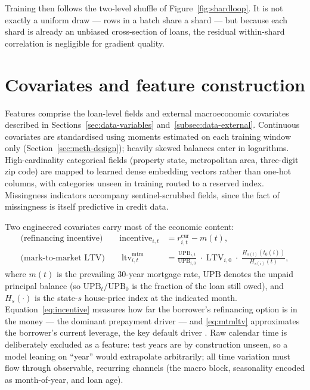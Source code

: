 Training then follows the two-level shuffle of
Figure~\ref{fig:shardloop}.  It is not exactly a uniform draw --- rows
in a batch share a shard --- but because each shard is already an
unbiased cross-section of loans, the residual within-shard
correlation is negligible for gradient quality.

\section{Covariates and feature construction}
\label{sec:meth-features}

Features comprise the loan-level fields and external macroeconomic
covariates described in Sections~\ref{sec:data-variables}
and~\ref{subsec:data-external}.  Continuous covariates are
standardised using moments estimated on each training window only
(Section~\ref{sec:meth-design}); heavily skewed balances enter in
logarithms.  High-cardinality categorical fields (property state,
metropolitan area, three-digit zip code) are mapped to learned dense
embedding vectors rather than one-hot columns, with categories unseen
in training routed to a reserved index.  Missingness indicators
accompany sentinel-scrubbed fields, since the fact of missingness is
itself predictive in credit data.

Two engineered covariates carry most of the economic content:
\begin{align}
\label{eq:incentive}
\text{(refinancing incentive)} \qquad
\mathrm{incentive}_{i,t} &= r^{\mathrm{cur}}_{i,t} - m(t),\\[2pt]
\label{eq:mtmltv}
\text{(mark-to-market LTV)} \qquad
\mathrm{ltv}^{\mathrm{mtm}}_{i,t} &=
\frac{\mathrm{UPB}_{i,t}}{\mathrm{UPB}_{i,0}}\;\cdot\;
\mathrm{LTV}_{i,0}\;\cdot\;
\frac{H_{s(i)}\!\left(t_0(i)\right)}{H_{s(i)}(t)},
\end{align}
where $m(t)$ is the prevailing 30-year mortgage rate,
$\mathrm{UPB}$ denotes the unpaid principal balance (so
$\mathrm{UPB}_t/\mathrm{UPB}_0$ is the fraction of the loan still
owed), and $H_s(\cdot)$ is the state-$s$ house-price index at the
indicated month.  Equation~\eqref{eq:incentive} measures how far the
borrower's refinancing option is in the money --- the dominant
prepayment driver \citep{schwartz1989} --- and
\eqref{eq:mtmltv} approximates the borrower's current leverage, the
key default driver \citep{deng2000}.  Raw calendar time is
deliberately excluded as a feature: test years are by construction
unseen, so a model leaning on ``year'' would extrapolate arbitrarily;
all time variation must flow through observable, recurring channels
(the macro block, seasonality encoded as month-of-year, and loan
age).

